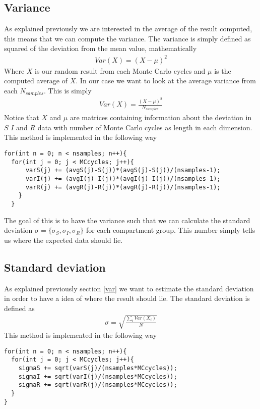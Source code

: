 \documentclass[a4paper, 10pt]{article}
\begin{document}
\subsection{Variance \label{var}} As explained previously we are interested in the average of the result computed,
this means that we can compute the variance. The variance is simply defined as squared of the deviation from the mean value,
mathematically
\begin{align}
  Var(X) = (X-\mu)^{2}
\end{align}
Where $X$ is our random result from each Monte Carlo cycles and $\mu$ is the computed
average of $X$. In our case we want to look at the average variance from each $N_{samples}$.
This is simply
\begin{align}
  Var(X) = \frac{(X-\mu)^{2}}{N_{samples}}
\end{align}
Notice that $X$ and $\mu$ are matrices containing information about the deviation in $S$
$I$ and $R$ data with number of Monte Carlo cycles as length in each dimension. This method is implemented in the following way
\begin{lstlisting}
for(int n = 0; n < nsamples; n++){
  for(int j = 0; j < MCcycles; j++){
      varS(j) += (avgS(j)-S(j))*(avgS(j)-S(j))/(nsamples-1);
      varI(j) += (avgI(j)-I(j))*(avgI(j)-I(j))/(nsamples-1);
      varR(j) += (avgR(j)-R(j))*(avgR(j)-R(j))/(nsamples-1);
    }
  }
\end{lstlisting}
The goal of this is to have the variance such that we can calculate the standard deviation $\sigma = \{\sigma_{S},\sigma_{I},\sigma_{R}\}$ for each
compartment group. This number simply tells us where the expected data should lie.
\subsection{Standard deviation} As explained previously section \eqref{var} we want to estimate the standard deviation
in order to have a idea of where the result should lie. The standard deviation is defined as
\begin{align}
  \sigma = \sqrt{\frac{\sum_{i}Var(X_{i})}{N}}
\end{align}
This method is implemented in the following way
\begin{lstlisting}
for(int n = 0; n < nsamples; n++){
  for(int j = 0; j < MCcycles; j++){
    sigmaS += sqrt(varS(j)/(nsamples*MCcycles));
    sigmaI += sqrt(varI(j)/(nsamples*MCcycles));
    sigmaR += sqrt(varR(j)/(nsamples*MCcycles));
  }
}
\end{lstlisting}
\end{document}
